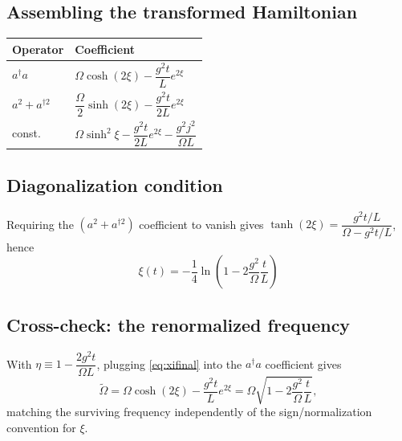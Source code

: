 \documentclass[../main.tex]{subfiles}
\begin{document}
\subsection{Assembling the transformed Hamiltonian}

\begin{center}
\begin{tabular}{ll}
\toprule
Operator & Coefficient \\
\midrule
$a^\dagger a$ & $\Omega\cosh(2\xi)-\dfrac{g^2t}{L}e^{2\xi}$ \\[2mm]
$a^2+a^{\dagger2}$ & $\dfrac{\Omega}{2}\sinh(2\xi)-\dfrac{g^2t}{2L}e^{2\xi}$ \\[2mm]
const. & $\Omega\sinh^2\xi-\dfrac{g^2t}{2L}e^{2\xi}-\dfrac{g^2j^2}{\Omega L}$ \\
\bottomrule
\end{tabular}
\end{center}

\subsection{Diagonalization condition}

Requiring the $(a^2+a^{\dagger2})$ coefficient to vanish gives $\tanh(2\xi)=\dfrac{g^2t/L}{\Omega-g^2t/L}$, hence
\begin{equation}
\boxed{\;\xi(t)=-\frac14\ln\!\left(1-2\frac{g^2}{\Omega}\frac{t}{L}\right)\;}
\label{eq:xifinal}
\end{equation}

\subsection{Cross-check: the renormalized frequency}

With $\eta\equiv1-\dfrac{2g^2t}{\Omega L}$, plugging \eqref{eq:xifinal} into the $a^\dagger a$ coefficient gives
\begin{equation}
\tilde\Omega=\Omega\cosh(2\xi)-\frac{g^2t}{L}e^{2\xi}=\Omega\sqrt{1-2\frac{g^2}{\Omega}\frac tL},
\end{equation}
matching the surviving frequency independently of the sign/normalization convention for $\xi$.
\end{document}

